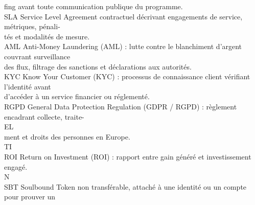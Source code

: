 fing avant toute communication publique du programme.\\
\vspace{0.5em}
SLA                                     Service Level Agreement contractuel décrivant engagements de service, métriques, pénali-\\
tés et modalités de mesure.\\
\vspace{0.5em}
AML                                     Anti-Money Laundering (AML) : lutte contre le blanchiment d’argent couvrant surveillance\\
des flux, filtrage des sanctions et déclarations aux autorités.\\
\vspace{0.5em}
KYC                                     Know Your Customer (KYC) : processus de connaissance client vérifiant l’identité avant\\
d’accéder à un service financier ou réglementé.\\
\vspace{0.5em}
RGPD                                    General Data Protection Regulation (GDPR / RGPD) : règlement encadrant collecte, traite-\\
\vspace{0.5em}
\vspace{0.5em}
\vspace{0.5em}
\vspace{0.5em}
EL\\
ment et droits des personnes en Europe.\\
\vspace{0.5em}
\vspace{0.5em}
\vspace{0.5em}
\vspace{0.5em}
TI\\
ROI                                     Return on Investment (ROI) : rapport entre gain généré et investissement engagé.\\
\vspace{0.5em}
\vspace{0.5em}
\vspace{0.5em}
\vspace{0.5em}
N\\
SBT                                     Soulbound Token non transférable, attaché à une identité ou un compte pour prouver un\\
\vspace{0.5em}
\vspace{0.5em}
\vspace{0.5em}
